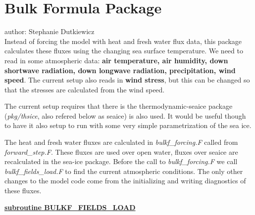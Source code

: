 % 
% 
% 
% 
% 

\def\deg{$^o$}
\section{Bulk Formula Package}

author: Stephanie Dutkiewicz\\

\noindent
Instead of forcing the model with heat and fresh water flux data,
this package calculates these fluxes using the changing sea surface
temperature. We need to read in some atmospheric data:
{\bf air temperature, air humidity, down shortwave radiation,
     down longwave radiation, precipitation, wind speed}.
The current setup also reads in {\bf wind stress}, but this
can be changed so that the stresses are calculated from the
wind speed.

The current setup requires that there is the thermodynamic-seaice package
({\it pkg/thsice}, also refered below as seaice)
is also used. It would be useful though to have it also
setup to run with some very simple parametrization of the sea ice.


\vspace{1cm}

\noindent
The heat and fresh water fluxes are calculated in {\it bulkf\_forcing.F}
called from {\it forward\_step.F}. These fluxes are used over open water,
fluxes over seaice are recalculated in the sea-ice package.
Before the call to {\it bulkf\_forcing.F} we call 
{\it bulkf\_fields\_load.F} to find the current atmospheric conditions.
The only other changes to the model code come from the initializing
and writing diagnostics of these fluxes.

\vspace{1cm}
\noindent
{\bf \underline{subroutine BULKF\_FIELDS\_LOAD}}

